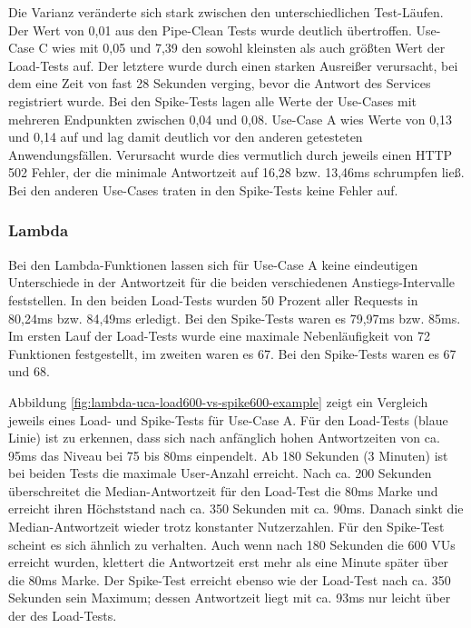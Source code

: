 Die Varianz veränderte sich stark zwischen den unterschiedlichen Test-Läufen. Der Wert von 0,01 aus den Pipe-Clean Tests wurde deutlich übertroffen. Use-Case C wies mit 0,05 und 7,39 den sowohl kleinsten als auch größten Wert der Load-Tests auf. Der letztere wurde durch einen starken Ausreißer verursacht, bei dem eine Zeit von fast 28 Sekunden verging, bevor die Antwort des Services registriert wurde. Bei den Spike-Tests lagen alle Werte der Use-Cases mit mehreren Endpunkten zwischen 0,04 und 0,08. Use-Case A wies Werte von 0,13 und 0,14 auf und lag damit deutlich vor den anderen getesteten Anwendungsfällen. Verursacht wurde dies vermutlich durch jeweils einen HTTP 502 Fehler, der die minimale Antwortzeit auf 16,28 bzw. 13,46ms schrumpfen ließ. Bei den anderen Use-Cases traten in den Spike-Tests keine Fehler auf.

\subsubsection{Lambda}
Bei den Lambda-Funktionen lassen sich für Use-Case A keine eindeutigen Unterschiede in der Antwortzeit für die beiden verschiedenen Anstiegs-\linebreak Intervalle feststellen. In den beiden Load-Tests wurden 50 Prozent aller Requests in 80,24ms bzw. 84,49ms erledigt. Bei den Spike-Tests waren es 79,97ms bzw. 85ms. Im ersten Lauf der Load-Tests wurde eine maximale Nebenläufigkeit von 72 Funktionen festgestellt, im zweiten waren es 67. Bei den Spike-Tests waren es 67 und 68.

Abbildung \ref{fig:lambda-uca-load600-vs-spike600-example} zeigt ein Vergleich jeweils eines Load- und Spike-Tests für Use-Case A. Für den Load-Tests (blaue Linie) ist zu erkennen, dass sich nach anfänglich hohen Antwortzeiten von ca. 95ms das Niveau bei 75 bis 80ms einpendelt. Ab 180 Sekunden (3 Minuten) ist bei beiden Tests die maximale User-Anzahl erreicht. Nach ca. 200 Sekunden überschreitet die Median-Antwortzeit für den Load-Test die 80ms Marke und erreicht ihren Höchststand nach ca. 350 Sekunden mit ca. 90ms. Danach sinkt die Median-Antwortzeit wieder trotz konstanter Nutzerzahlen.
Für den Spike-Test scheint es sich ähnlich zu verhalten. Auch wenn nach 180 Sekunden die 600 \acp{VU} erreicht wurden, klettert die Antwortzeit erst mehr als eine Minute später über die 80ms Marke. Der Spike-Test erreicht ebenso wie der Load-Test nach ca. 350 Sekunden sein Maximum; dessen Antwortzeit liegt mit ca. 93ms nur leicht über der des Load-Tests.

